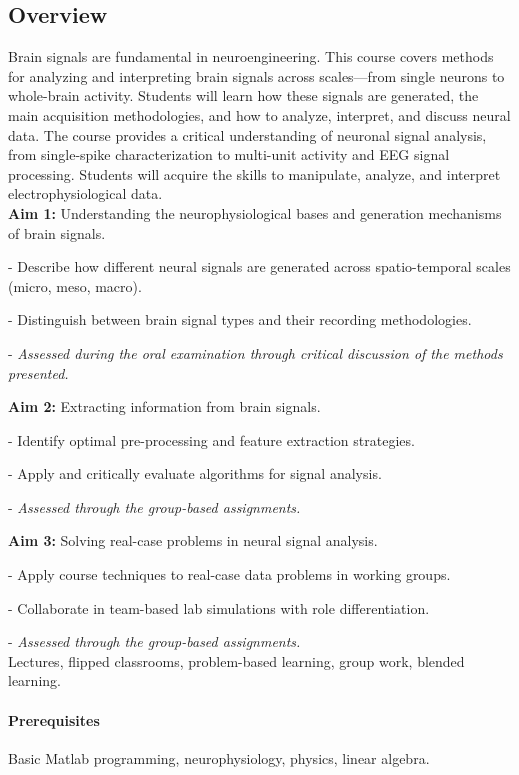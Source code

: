 \subsection*{Overview}
Brain signals are fundamental in neuroengineering. This course covers methods for analyzing and interpreting brain signals across scales—from single neurons to whole-brain activity. Students will learn how these signals are generated, the main acquisition methodologies, and how to analyze, interpret, and discuss neural data.
The course provides a critical understanding of neuronal signal analysis, from single-spike characterization to multi-unit activity and EEG signal processing. Students will acquire the skills to manipulate, analyze, and interpret electrophysiological data.\\ 


\textbf{Aim 1:} Understanding the neurophysiological bases and generation mechanisms of brain signals.

- Describe how different neural signals are generated across spatio-temporal scales (micro, meso, macro).  

- Distinguish between brain signal types and their recording methodologies.

- \textit{Assessed during the oral examination through critical discussion of the methods presented.} 

\textbf{Aim 2:} Extracting information from brain signals.
 
- Identify optimal pre-processing and feature extraction strategies.  

- Apply and critically evaluate algorithms for signal analysis.

- \textit{Assessed through the group-based assignments.} 


\textbf{Aim 3:} Solving real-case problems in neural signal analysis.

- Apply course techniques to real-case data problems in working groups.  

- Collaborate in team-based lab simulations with role differentiation.

- \textit{Assessed through the group-based assignments.} \\ 


Lectures, flipped classrooms, problem-based learning, group work, blended learning.\\

\paragraph*{Prerequisites}
Basic Matlab programming, neurophysiology, physics, linear algebra.\\

